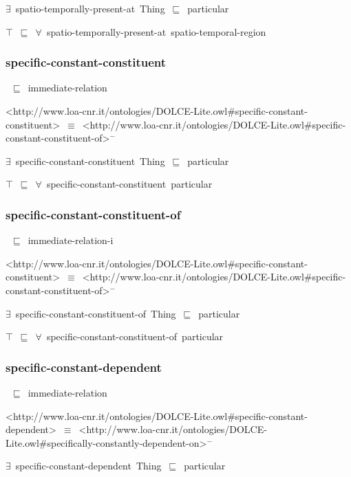 \documentclass{article}
\begin{document}
\ensuremath{\exists}~spatio-temporally-present-at~Thing~\ensuremath{\sqsubseteq}~particular

\ensuremath{\top}~\ensuremath{\sqsubseteq}~\ensuremath{\forall}~spatio-temporally-present-at~spatio-temporal-region

\subsubsection*{specific-constant-constituent}

~\ensuremath{\sqsubseteq}~immediate-relation

<http://www.loa-cnr.it/ontologies/DOLCE-Lite.owl#specific-constant-constituent>~\ensuremath{\equiv}~<http://www.loa-cnr.it/ontologies/DOLCE-Lite.owl#specific-constant-constituent-of>\ensuremath{^-}

\ensuremath{\exists}~specific-constant-constituent~Thing~\ensuremath{\sqsubseteq}~particular

\ensuremath{\top}~\ensuremath{\sqsubseteq}~\ensuremath{\forall}~specific-constant-constituent~particular

\subsubsection*{specific-constant-constituent-of}

~\ensuremath{\sqsubseteq}~immediate-relation-i

<http://www.loa-cnr.it/ontologies/DOLCE-Lite.owl#specific-constant-constituent>~\ensuremath{\equiv}~<http://www.loa-cnr.it/ontologies/DOLCE-Lite.owl#specific-constant-constituent-of>\ensuremath{^-}

\ensuremath{\exists}~specific-constant-constituent-of~Thing~\ensuremath{\sqsubseteq}~particular

\ensuremath{\top}~\ensuremath{\sqsubseteq}~\ensuremath{\forall}~specific-constant-constituent-of~particular

\subsubsection*{specific-constant-dependent}

~\ensuremath{\sqsubseteq}~immediate-relation

<http://www.loa-cnr.it/ontologies/DOLCE-Lite.owl#specific-constant-dependent>~\ensuremath{\equiv}~<http://www.loa-cnr.it/ontologies/DOLCE-Lite.owl#specifically-constantly-dependent-on>\ensuremath{^-}

\ensuremath{\exists}~specific-constant-dependent~Thing~\ensuremath{\sqsubseteq}~particular
\end{document}
